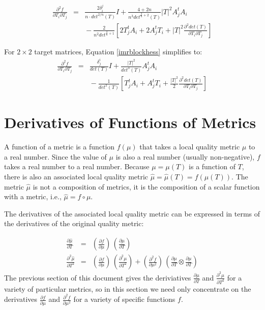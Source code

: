 \documentclass{report}
\begin{document}
\begin{eqnarray} \label{imrblockhess}
\frac{\partial^2 f}{\partial T_i \partial T_j} 
&=& \frac{2 \delta_i^j}{n \cdot det^{2/n}(T)} I
+ \frac{4 + 2n}{n^3 det^{\frac{2}{n}+2}(T)} |T|^2 A_j^t A_i \\ \nonumber
& & {} - \frac{2}{n^2 det^{\frac{2}{n}+1}} \left[ 
2 T_j^t A_i + 2 A_j^t T_i + |T|^2 \frac{\partial^2 det(T)}{\partial T_i \partial T_j} \right]
\end{eqnarray}



\noindent For $2 \times 2$ target matrices, Equation \ref{imrblockhess} simplifies to:
\begin{eqnarray}
\frac{\partial^2 f}{\partial T_i \partial T_j}
&=& \frac{\delta^i_j}{det(T)}I + \frac{|T|^2}{det^3(T)} A_j^t A_i \\ \nonumber
& & {} - \frac{1}{det^2(T)} \left[ T_j^t A_i + A_j^t T_i 
+ \frac{|T|^2}{2} \frac{\partial^2 det(T)}{\partial T_i \partial T_j} \right]
\end{eqnarray}

\chapter{Derivatives of Functions of Metrics} 
A function of a metric is a function $f(\mu)$ that takes a local quality metric
$\mu$ to a real number. Since the value of $\mu$ is also a real number (usually
non-negative), $f$ takes a real number to a real number. Because 
$\mu = \mu(T)$ is a function of $T$, there is also an associated local quality 
metric $\hat{\mu} = \hat{\mu}(T) = f(\mu(T))$. The metric $\hat{\mu}$ 
is not a composition of metrics, it is the composition of a scalar function 
with a metric, i.e., $\hat{\mu} = f \circ \mu$. \newline

\noindent The derivatives of the associated local quality metric can be 
expressed in terms of the derivatives of the original quality metric:

\begin{eqnarray}
\frac{\partial \hat{\mu}}{\partial T} & = & \left( \frac{\partial f}{\partial \mu} \right) \, \left( \frac{\partial \mu}{\partial T} \right) \\
\frac{\partial^2 \hat{\mu}}{\partial T^2} & = & \left( \frac{\partial f}{\partial \mu} \right) \, \left( \frac{\partial^2 \mu}{\partial T^2} \right) + \left( \frac{\partial^2 f}{\partial \mu^2} \right) \, \left( \frac{\partial \mu}{\partial T} \otimes \frac{\partial \mu}{\partial T} \right)
\end{eqnarray}
The previous section of this document gives the deriviatives 
$\frac{\partial \mu}{\partial T}$ and $\frac{\partial^2 \mu}{\partial T^2}$ 
for a variety of particular metrics, so in this section we need only 
concentrate on the derivatives $\frac{\partial f}{\partial \mu}$ and 
$\frac{\partial^2 f}{\partial \mu^2}$ for a variety of specific functions $f$.
\end{document}
